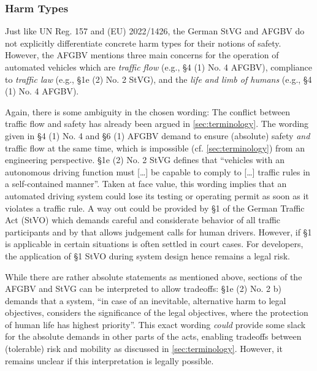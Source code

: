 \subsubsection{Harm Types}
Just like UN Reg. 157 and (EU) 2022/1426, the German StVG and AFGBV do not explicitly differentiate concrete harm types for their notions of safety.
However, the AFGBV mentions three main concerns for the operation of automated vehicles which are \emph{traffic flow} (e.g., §4 (1) No. 4 AFGBV), compliance to \emph{traffic law} (e.g., §1e (2) No. 2 StVG), and the \emph{life and limb of humans} (e.g., §4 (1) No. 4 AFGBV).

Again, there is some ambiguity in the chosen wording:
The conflict between traffic flow and safety has already been argued in \cref{sec:terminology}.
The wording given in §4 (1) No. 4 and §6 (1) AFGBV  demand to ensure (absolute) safety \emph{and} traffic flow at the same time, which is impossible (cf. \cref{sec:terminology}) from an engineering perspective.
§1e (2) No. 2 StVG defines that ``vehicles with an autonomous driving function must [\ldots] be capable to comply to [\ldots] traffic rules in a self-contained manner''.
Taken at face value, this wording implies that an automated driving system could lose its testing or operating permit as soon as it violates a traffic rule.
A way out could be provided by §1 of the German Traffic Act (StVO) which demands careful and considerate behavior of all traffic participants and by that allows judgement calls for human drivers.
However, if §1 is applicable in certain situations is often settled in court cases. 
For developers, the application of §1 StVO during system design hence remains a legal risk.

While there are rather absolute statements as mentioned above, sections of the AFGBV and StVG can be interpreted to allow tradeoffs:
§1e (2) No. 2 b) demands that a system,  ``in case of an inevitable, alternative harm to legal objectives, considers the significance of the legal objectives, where the protection of human life has highest priority''.
This exact wording \emph{could} provide some slack for the absolute demands in other parts of the acts, enabling tradeoffs between (tolerable) risk and mobility as discussed in \cref{sec:terminology}.
However, it remains unclear if this interpretation is legally possible.

